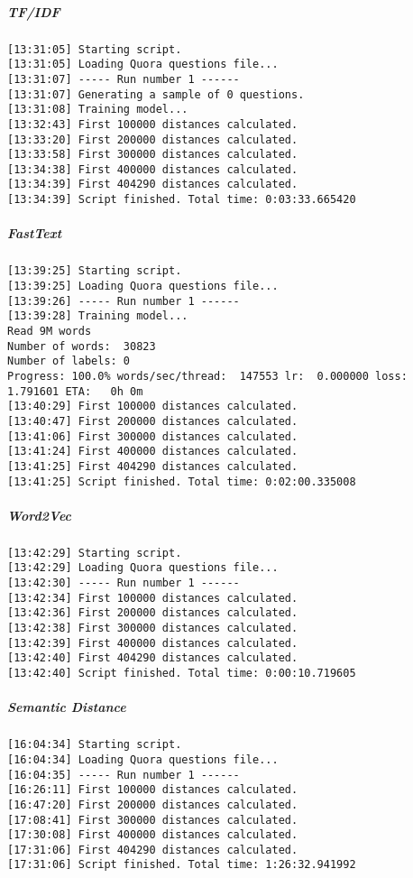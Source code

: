 \subparagraph{TF/IDF}
\begin{verbatim}
[13:31:05] Starting script.
[13:31:05] Loading Quora questions file...
[13:31:07] ----- Run number 1 ------
[13:31:07] Generating a sample of 0 questions.
[13:31:08] Training model...
[13:32:43] First 100000 distances calculated.
[13:33:20] First 200000 distances calculated.
[13:33:58] First 300000 distances calculated.
[13:34:38] First 400000 distances calculated.
[13:34:39] First 404290 distances calculated.
[13:34:39] Script finished. Total time: 0:03:33.665420
\end{verbatim}

\subparagraph{FastText}
\begin{verbatim}
[13:39:25] Starting script.
[13:39:25] Loading Quora questions file...
[13:39:26] ----- Run number 1 ------
[13:39:28] Training model...
Read 9M words
Number of words:  30823
Number of labels: 0
Progress: 100.0% words/sec/thread:  147553 lr:  0.000000 loss:  1.791601 ETA:   0h 0m
[13:40:29] First 100000 distances calculated.
[13:40:47] First 200000 distances calculated.
[13:41:06] First 300000 distances calculated.
[13:41:24] First 400000 distances calculated.
[13:41:25] First 404290 distances calculated.
[13:41:25] Script finished. Total time: 0:02:00.335008
\end{verbatim}

\subparagraph{Word2Vec}
\begin{verbatim}
[13:42:29] Starting script.
[13:42:29] Loading Quora questions file...
[13:42:30] ----- Run number 1 ------
[13:42:34] First 100000 distances calculated.
[13:42:36] First 200000 distances calculated.
[13:42:38] First 300000 distances calculated.
[13:42:39] First 400000 distances calculated.
[13:42:40] First 404290 distances calculated.
[13:42:40] Script finished. Total time: 0:00:10.719605
\end{verbatim}

\subparagraph{Semantic Distance}
\begin{verbatim}
[16:04:34] Starting script.
[16:04:34] Loading Quora questions file...
[16:04:35] ----- Run number 1 ------
[16:26:11] First 100000 distances calculated.
[16:47:20] First 200000 distances calculated.
[17:08:41] First 300000 distances calculated.
[17:30:08] First 400000 distances calculated.
[17:31:06] First 404290 distances calculated.
[17:31:06] Script finished. Total time: 1:26:32.941992
\end{verbatim}


